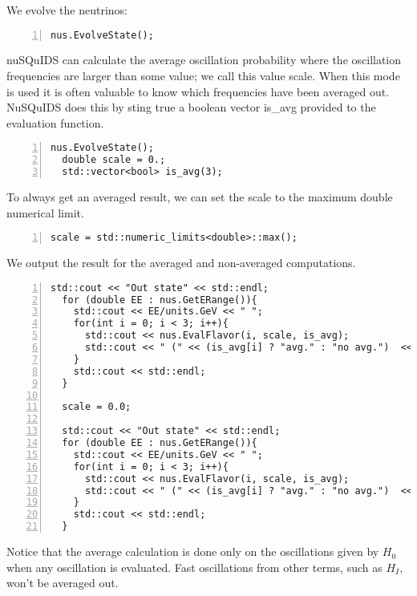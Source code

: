 \documentclass[3p,12pt]{elsarticle}
\newcommand{\ttf}{\ttfamily}
\begin{document}
We evolve the neutrinos:

\begin{lstlisting}[frame=leftline, numbers =
  left,breaklines=true,label = ex:sin1]
  nus.EvolveState();
\end{lstlisting}

{\ttf nuSQuIDS} can calculate the average oscillation probability
where the oscillation frequencies are larger than some value;
we call this value {\ttf scale}. When this mode is used it is often
valuable to know which frequencies have been averaged out.
NuSQuIDS does this by sting true a boolean vector {\ttf is\_avg} provided to the
evaluation function.

\begin{lstlisting}[frame=leftline, numbers =
  left,breaklines=true,label = ex:sin1]
  nus.EvolveState();
  double scale = 0.;
  std::vector<bool> is_avg(3);
\end{lstlisting}

To always get an averaged result, we can set the scale to the maximum
double numerical limit.

\begin{lstlisting}[frame=leftline, numbers =
  left,breaklines=true,label = ex:sin1]
  scale = std::numeric_limits<double>::max();
\end{lstlisting}

We output the result for the averaged and non-averaged computations.

\begin{lstlisting}[frame=leftline, numbers =
  left,breaklines=true,label = ex:sin1]
    std::cout << "Out state" << std::endl;
  for (double EE : nus.GetERange()){
    std::cout << EE/units.GeV << " ";
    for(int i = 0; i < 3; i++){
      std::cout << nus.EvalFlavor(i, scale, is_avg);
      std::cout << " (" << (is_avg[i] ? "avg." : "no avg.")  << ") ";
    }
    std::cout << std::endl;
  }

  scale = 0.0;

  std::cout << "Out state" << std::endl;
  for (double EE : nus.GetERange()){
    std::cout << EE/units.GeV << " ";
    for(int i = 0; i < 3; i++){
      std::cout << nus.EvalFlavor(i, scale, is_avg);
      std::cout << " (" << (is_avg[i] ? "avg." : "no avg.")  << ") ";
    }
    std::cout << std::endl;
  }
\end{lstlisting}

Notice that the average calculation is done only on the
oscillations given by $H_0$ when any oscillation is evaluated. Fast
oscillations from other terms, such as $H_I$, won't be
averaged out.
\end{document}
